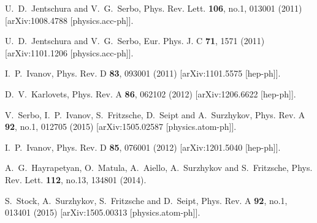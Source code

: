 \documentclass[aps,prd,longbibliography,nofootinbib,amsthm,amsmath,amssymb,amsfonts,notitlepage]{revtex4-1}
\begin{document}
\begin{thebibliography}{99}

U.~D.~Jentschura and V.~G.~Serbo,
Phys. Rev. Lett. \textbf{106}, no.1, 013001 (2011)
[arXiv:1008.4788 [physics.acc-ph]].

U.~D.~Jentschura and V.~G.~Serbo,
Eur. Phys. J. C \textbf{71}, 1571 (2011)
[arXiv:1101.1206 [physics.acc-ph]].

I.~P.~Ivanov,
Phys. Rev. D \textbf{83}, 093001 (2011)
[arXiv:1101.5575 [hep-ph]].

D.~V.~Karlovets,
Phys. Rev. A \textbf{86}, 062102 (2012)
[arXiv:1206.6622 [hep-ph]].

V.~Serbo, I.~P.~Ivanov, S.~Fritzsche, D.~Seipt and A.~Surzhykov,
Phys. Rev. A \textbf{92}, no.1, 012705 (2015)
[arXiv:1505.02587 [physics.atom-ph]].

I.~P.~Ivanov,
Phys. Rev. D \textbf{85}, 076001 (2012)
[arXiv:1201.5040 [hep-ph]].

A.~G.~Hayrapetyan, O.~Matula, A.~Aiello, A.~Surzhykov and S.~Fritzsche,
Phys. Rev. Lett. \textbf{112}, no.13, 134801 (2014).

S.~Stock, A.~Surzhykov, S.~Fritzsche and D.~Seipt,
Phys. Rev. A \textbf{92}, no.1, 013401 (2015)
[arXiv:1505.00313 [physics.atom-ph]].


\end{thebibliography}
\end{document}

